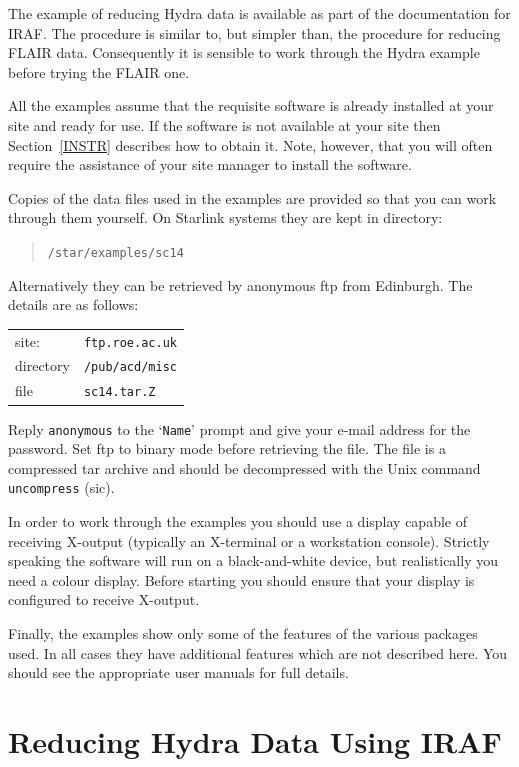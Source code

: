 \documentclass[twoside,11pt]{article}
\newcommand{\xlabel}[1]{}
\begin{document}
The example of reducing Hydra data is available as part of the
documentation for IRAF.  The procedure is similar to, but simpler
than, the procedure for reducing FLAIR data.  Consequently it is
sensible to work through the Hydra example before trying the FLAIR
one.

All the examples assume that the requisite software is already installed
at your site and ready for use.  If the software is not available at
your site then Section~\ref{INSTR} describes how to obtain it.  Note,
however, that you will often require the assistance of your site manager
to install the software.

Copies of the data files used in the examples are provided so that you can
work through them yourself.  On Starlink systems they are kept in directory:

\begin{quote}
{\tt /star/examples/sc14}
\end{quote}

Alternatively they can be retrieved by anonymous ftp from Edinburgh.
The details are as follows:

\begin{tabular}{ll}
site:     & {\tt ftp.roe.ac.uk} \\
directory & {\tt /pub/acd/misc} \\
file      & {\tt sc14.tar.Z}    \\
\end{tabular}

Reply {\tt anonymous} to the `{\tt Name}' prompt and give your e-mail
address for the password.  Set ftp to binary mode before retrieving the
file.  The file is a compressed tar archive and should be decompressed
with the Unix command {\tt uncompress} (sic).

In order to work through the examples you should use a display capable
of receiving X-output (typically an X-terminal or a workstation console).
Strictly speaking the software will run on a black-and-white device, but
realistically you need a colour display.  Before starting you should
ensure that your display is configured to receive X-output.

Finally, the examples show only some of the features of the various
packages used.  In all cases they have additional features which are not
described here.  You should see the appropriate user manuals for full
details.


\newpage
\section{\xlabel{HYDRA}\label{HYDRA}Reducing Hydra Data Using IRAF}
\end{document}
